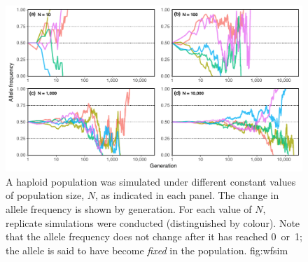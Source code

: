 

\begin{figure}[!htb]
\centering
\includegraphics[width=\textwidth]{./img/ch1/wfsim}
{A haploid population was simulated under  different constant values of population size, $N$, as indicated in each panel.
The change in allele frequency is shown by generation.
For each value of $N$,  replicate simulations were conducted (distinguished by colour).
Note that the allele frequency does not change after it has reached 0~or~1; \ie the allele is said to have become \emph{fixed} in the population.}
{fig:wfsim}
\end{figure}
